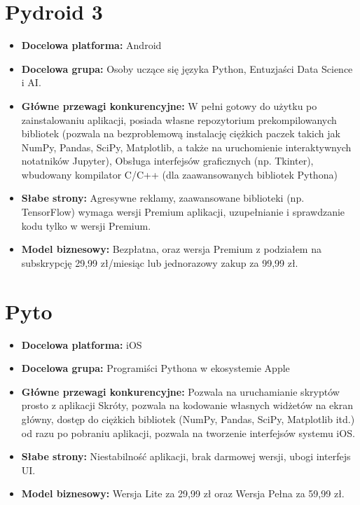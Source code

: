 \section{Pydroid 3} 
\begin{itemize}
    
    \item \textbf{Docelowa platforma:} Android
    \item \textbf{Docelowa grupa:} Osoby uczące się języka Python, Entuzjaści Data Science i AI. 
    \item \textbf{Główne przewagi konkurencyjne:} W pełni gotowy do użytku po zainstalowaniu aplikacji, posiada własne repozytorium prekompilowanych bibliotek (pozwala na bezproblemową instalację ciężkich paczek takich jak NumPy, Pandas, SciPy, Matplotlib, a także na uruchomienie interaktywnych notatników Jupyter), Obsługa interfejsów graficznych (np. Tkinter), wbudowany kompilator C/C++ (dla zaawansowanych bibliotek Pythona) 
    \item \textbf{Słabe strony:} Agresywne reklamy, zaawansowane biblioteki (np. TensorFlow) wymaga wersji Premium aplikacji, uzupełnianie i sprawdzanie kodu tylko w wersji Premium. 
    \item \textbf{Model biznesowy:} Bezpłatna, oraz wersja Premium z podziałem na subskrypcję 29,99 zł/miesiąc lub jednorazowy zakup za 99,99 zł. 
\end{itemize}

\newpage
\section{Pyto}
\begin{itemize}
    
    \item \textbf{Docelowa platforma:} iOS 
    \item \textbf{Docelowa grupa:} Programiści Pythona w ekosystemie Apple 
    \item \textbf{Główne przewagi konkurencyjne:} Pozwala na uruchamianie skryptów prosto z aplikacji Skróty, pozwala na kodowanie własnych widżetów na ekran główny, dostęp do ciężkich bibliotek (NumPy, Pandas, SciPy, Matplotlib itd.) od razu po pobraniu aplikacji, pozwala na tworzenie interfejsów systemu iOS. 
    \item \textbf{Słabe strony:} Niestabilność aplikacji, brak darmowej wersji, ubogi interfejs UI. 
    \item \textbf{Model biznesowy:} Wersja Lite za 29,99 zł oraz Wersja Pełna za 59,99 zł. 
\end{itemize}

